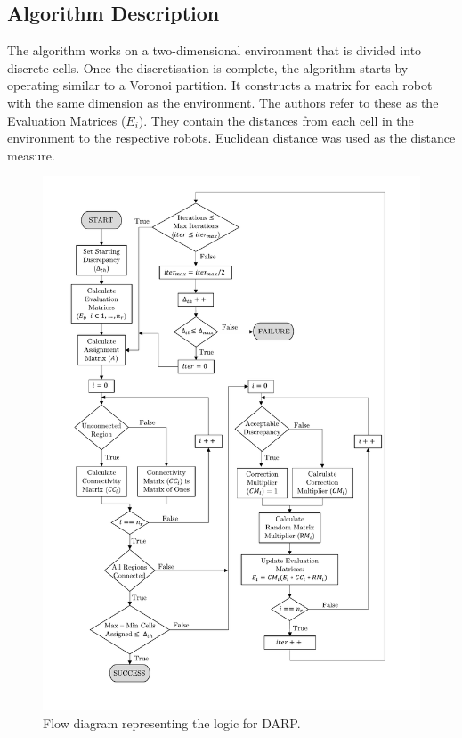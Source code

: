 \subsection{Algorithm Description}
The algorithm works on a two-dimensional environment that is divided into discrete cells. Once the discretisation is complete, the algorithm starts by operating similar to a Voronoi partition. It constructs a matrix for each robot with the same dimension as the environment. The authors refer to these as the Evaluation Matrices ($E_i$). They contain the distances from each cell in the environment to the respective robots. Euclidean distance was used as the distance measure.                                                                                                                                                                                                                                                                                                                                                                                                                                                                                                                                                                             
\begin{figure}[h!]
\centering
\includegraphics[scale=0.8,trim={1.5cm 0 1.5cm 0},clip]{figs/DARP_Diagram3.pdf}
\caption{Flow diagram representing the logic for DARP.}
\label{fig:DARP}
\end{figure}
